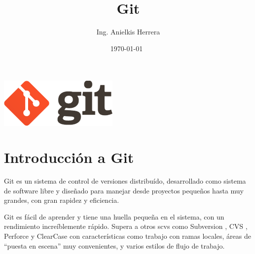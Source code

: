 \documentclass[12pt, spanish, oneside, onecolumn, a4paper]{report}
\makeatletter
\def\maketitle{%
  \null
  \thispagestyle{empty}%
  \vfill
  \begin{center}\leavevmode
    \normalfont
    \includegraphics{logo.png}\\[1cm]
    \vskip 1cm
    {\Large \@author\par}%
    \vskip 1cm
    {\Large \@date\par}%
  \end{center}%
  \vfill
  \null
  \cleardoublepage
  }
\makeatother
\begin{document}
\pagestyle{fancy}

\title{ Git }
\date{ \today\ }
\author{ Ing. Anielkis Herrera }

\maketitle


\newpage
{}


\chapter{Introducción a Git}
\label{chap:intro}





Git es un sistema de control de versiones distribuído, desarrollado como sistema de software libre y diseñado para manejar desde proyectos pequeños hasta muy grandes, con gran rapidez y eficiencia.

Git es fácil de aprender y tiene una huella pequeña en el sistema, con un rendimiento increíblemente rápido. Supera a otros \glspl{scv} como Subversion , CVS , Perforce y ClearCase con características como trabajo con ramas locales, áreas de ``puesta en escena'' muy convenientes, y varios estilos de flujo de trabajo.
\end{document}
